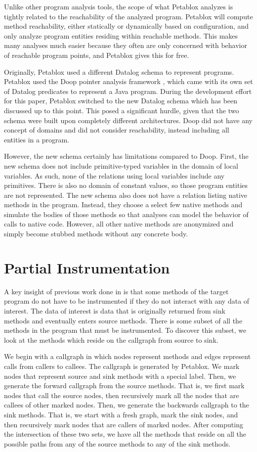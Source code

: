 Unlike other program analysis tools, the scope of what Petablox analyzes is tightly related to the reachability of the analyzed program. Petablox will compute method reachability, either statically or dynamically based on configuration, and only analyze program entities residing within reachable methods. This makes many analyses much easier because they often are only concerned with behavior of reachable program points, and Petablox gives this for free.

Originally, Petablox used a different Datalog schema to represent programs. Petablox used the Doop pointer analysis framework \cite{doop}, which came with its own set of Datalog predicates to represent a Java program. During the development effort for this paper, Petablox switched to the new Datalog schema which has been discussed up to this point. This posed a significant hurdle, given that the two schema were built upon completely different architectures. Doop did not have any concept of domains and did not consider reachability, instead including all entities in a program.  

However, the new schema certainly has limitations compared to Doop. First, the new schema does not include primitive-typed variables in the domain of local variables. As such, none of the relations using local variables include any primitives. There is also no domain of constant values, so those program entities are not represented. The new schema also does not have a relation listing native methods in the program. Instead, they choose a select few native methods and simulate the bodies of those methods so that analyses can model the behavior of calls to native code. However, all other native methods are anonymized and simply become stubbed methods without any concrete body.
\section{Partial Instrumentation}
A key insight of previous work done in \cite{manoj_project} is that some methods of the target program do not have to be instrumented if they do not interact with any data of interest. The data of interest is data that is originally returned from sink methods and eventually enters source methods. There is some subset of all the methods in the program that must be instrumented. To discover this subset, we look at the methods which reside on the callgraph from source to sink. 

We begin with a callgraph in which nodes represent methods and edges represent calls from callers to callees. The callgraph is generated by Petablox. We mark nodes that represent source and sink methods with a special label. Then, we generate the forward callgraph from the source methods. That is, we first mark nodes that call the source nodes, then recursively mark all the nodes that are callees of other marked nodes. Then, we generate the backwards callgraph to the sink methods. That is, we start with a fresh graph, mark the sink nodes, and then recursively mark nodes that are callers of marked nodes. After computing the intersection of these two sets, we have all the methods that reside on all the possible paths from any of the source methods to any of the sink methods. 

